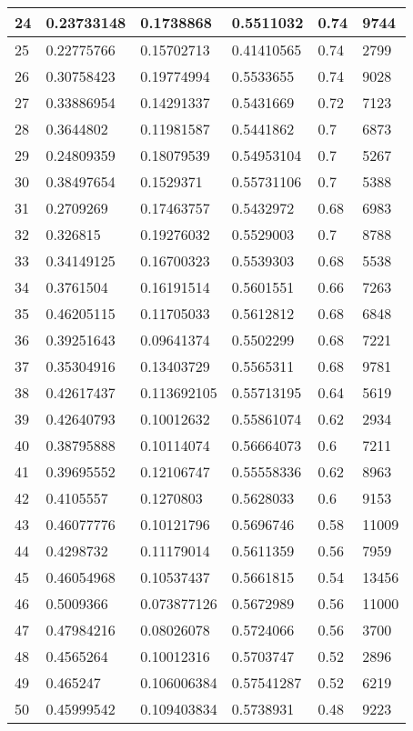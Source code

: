 \begin{longtable}{|l|l|l|l|l|l|}
24 & 0.23733148 & 0.1738868 & 0.5511032 & 0.74 & 9744 \\ \hline 
25 & 0.22775766 & 0.15702713 & 0.41410565 & 0.74 & 2799 \\ \hline 
26 & 0.30758423 & 0.19774994 & 0.5533655 & 0.74 & 9028 \\ \hline 
27 & 0.33886954 & 0.14291337 & 0.5431669 & 0.72 & 7123 \\ \hline 
28 & 0.3644802 & 0.11981587 & 0.5441862 & 0.7 & 6873 \\ \hline 
29 & 0.24809359 & 0.18079539 & 0.54953104 & 0.7 & 5267 \\ \hline 
30 & 0.38497654 & 0.1529371 & 0.55731106 & 0.7 & 5388 \\ \hline 
31 & 0.2709269 & 0.17463757 & 0.5432972 & 0.68 & 6983 \\ \hline 
32 & 0.326815 & 0.19276032 & 0.5529003 & 0.7 & 8788 \\ \hline 
33 & 0.34149125 & 0.16700323 & 0.5539303 & 0.68 & 5538 \\ \hline 
34 & 0.3761504 & 0.16191514 & 0.5601551 & 0.66 & 7263 \\ \hline 
35 & 0.46205115 & 0.11705033 & 0.5612812 & 0.68 & 6848 \\ \hline 
36 & 0.39251643 & 0.09641374 & 0.5502299 & 0.68 & 7221 \\ \hline 
37 & 0.35304916 & 0.13403729 & 0.5565311 & 0.68 & 9781 \\ \hline 
38 & 0.42617437 & 0.113692105 & 0.55713195 & 0.64 & 5619 \\ \hline 
39 & 0.42640793 & 0.10012632 & 0.55861074 & 0.62 & 2934 \\ \hline 
40 & 0.38795888 & 0.10114074 & 0.56664073 & 0.6 & 7211 \\ \hline 
41 & 0.39695552 & 0.12106747 & 0.55558336 & 0.62 & 8963 \\ \hline 
42 & 0.4105557 & 0.1270803 & 0.5628033 & 0.6 & 9153 \\ \hline 
43 & 0.46077776 & 0.10121796 & 0.5696746 & 0.58 & 11009 \\ \hline 
44 & 0.4298732 & 0.11179014 & 0.5611359 & 0.56 & 7959 \\ \hline 
45 & 0.46054968 & 0.10537437 & 0.5661815 & 0.54 & 13456 \\ \hline 
46 & 0.5009366 & 0.073877126 & 0.5672989 & 0.56 & 11000 \\ \hline 
47 & 0.47984216 & 0.08026078 & 0.5724066 & 0.56 & 3700 \\ \hline 
48 & 0.4565264 & 0.10012316 & 0.5703747 & 0.52 & 2896 \\ \hline 
49 & 0.465247 & 0.106006384 & 0.57541287 & 0.52 & 6219 \\ \hline 
50 & 0.45999542 & 0.109403834 & 0.5738931 & 0.48 & 9223 \\ \hline 
\end{longtable}